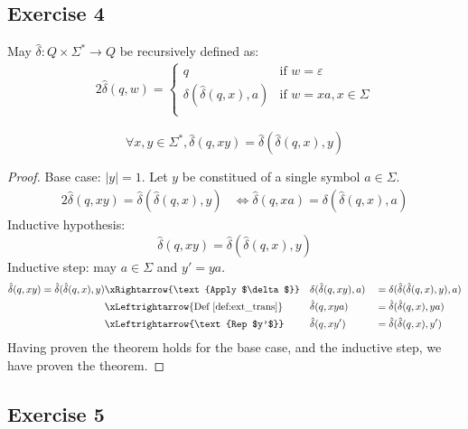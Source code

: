 {\subsection{Exercise 4}
\begin{definition}
\label{def:ext_trans}
May $\hat{\delta}\colon Q\times \Sigma^\ast \rightarrow Q$ be recursively defined as:
\begin{alignat*}{2}
	\hat{\delta}(q,w)= \begin{cases}
		  q                           & \text{if } w=\varepsilon\\
		  \delta(\hat{\delta}(q,x),a) & \text{if } w=xa, x\in\Sigma\\
		  \end{cases}
\end{alignat*}
\end{definition}
\begin{theorem}
	\begin{equation*}
		\forall x,y \in \Sigma^\ast,\hat{\delta}(q,xy)=\hat{\delta}(\hat{\delta}(q,x),y)
	\end{equation*}
\end{theorem}
\begin{proof}
Base case: $|y|=1$. Let $y$ be constitued of a single symbol $a\in\Sigma$.
\begin{alignat*}{2}
	\hat{\delta}(q,xy)=\hat{\delta}(\hat{\delta}(q,x),y)
	&\iff \hat{\delta}(q,xa)=\delta(\hat{\delta}(q,x),a)
\end{alignat*}
Inductive hypothesis:
\begin{equation*}
	\hat{\delta}(q,xy)=\hat{\delta}(\hat{\delta}(q,x),y)
\end{equation*}
Inductive step: may $a\in\Sigma$ and $y'=ya$.
\begin{alignat*}{3}
	\hat{\delta}(q,xy)=\hat{\delta}(\hat{\delta}(q,x),y)
	&\xRightarrow{\text{Apply $\delta$}} &&\delta(\hat{\delta}(q,xy),a)&&=\delta(\hat{\delta}(\hat{\delta}(q,x),y),a) \\
	&\xLeftrightarrow{\text{Def \ref{def:ext_trans}}}     &&\hat{\delta}(q,xya)         &&=\hat{\delta}(\hat{\delta}(q,x),ya) \\
	&\xLeftrightarrow{\text{Rep $y'$}}     &&\hat{\delta}(q,xy')         &&=\hat{\delta}(\hat{\delta}(q,x),y')
\end{alignat*}
Having proven the theorem holds for the base case, and the inductive step, we have proven the theorem.
\end{proof}
\pagebreak
\subsection{Exercise 5}
}
